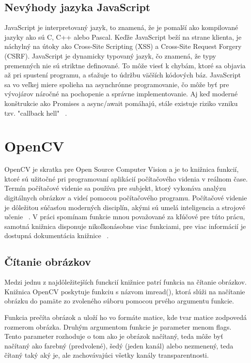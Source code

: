 \subsection{Nevýhody jazyka JavaScript}
JavaScript je interpretovaný jazyk, to znamená, že je pomalší ako kompilované jazyky ako sú C, C++ alebo Pascal. 
Keďže JavaScript beží na strane klienta, je náchylný na útoky ako Cross-Site Scripting (XSS) a Cross-Site Request Forgery (CSRF).
JavaScript je dynamicky typovaný jazyk, čo znamená, že typy premenných nie sú striktne definované. To môže viesť k chybám, ktoré sa 
objavia až pri spustení programu, a sťažuje to údržbu väčších kódových báz. JavaScript sa vo veľkej miere spolieha na asynchrónne programovanie, 
čo môže byť pre vývojárov náročné na pochopenie a správne implementovanie. Aj keď moderné konštrukcie ako Promises a async/await pomáhajú, 
stále existuje riziko vzniku tzv. "callback hell" ~\cite{itpedia_js_downsides}.


\section{OpenCV}
OpenCV je skratka pre Open Source Computer Vision a je to knižnica funkcií, ktoré sú užitočné pri programovaní 
aplikácií počítačového videnia v reálnom čase. Termín počítačové videnie sa používa pre subjekt, ktorý vykonáva 
analýzu digitálnych obrázkov a videí pomocou počítačového programu. Počítačové videnie je dôležitou súčasťou 
moderných disciplín, akými sú umelá inteligencia a strojové učenie ~\cite{tutorialspoint_opencv}. V práci 
spomínam funkcie mnou považované za kľúčové pre túto prácu, samotná knižnica disponuje nikoľkonásobne viac 
funkciami, pre viac informácií je dostupná dokumentácia knižnice ~\cite{documentation_opencv}.

\subsection{Čítanie obrázkov}
Medzi jednu z najdôležitejších funckcií knižnice patrí funkcia na čítanie obrázkov. Knižnica OpenCV poskytuje 
funkciu s názvom imread(), ktorá slúži na načítanie obrázku do pamäte zo zvoleného súboru pomocou prvého argumentu 
funkcie.  

Funkcia prečíta obrázok a uloží ho vo formáte matice, kde tvar matice zodpovedá rozmerom obrázka. Druhým argumentom 
funkcie je parameter menom flags. Tento parameter rozhoduje o tom ako je obrázok načítaný, teda môže byť načítaný 
ako farebný (predvolené), šedý (jeden kanál) alebo nezmenený, teda čítaný taký aký je, ale zachovávajúci všetky 
kanály transparentnosti.

